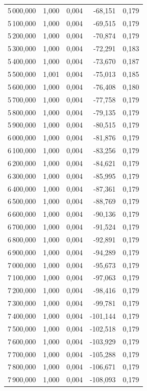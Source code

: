 \begin{longtable}{rrrrr}
5\,000,000 & 1,000 & 0,004 & -68,151 & 0,179\\
5\,100,000 & 1,000 & 0,004 & -69,515 & 0,179\\
5\,200,000 & 1,000 & 0,004 & -70,874 & 0,179\\
5\,300,000 & 1,000 & 0,004 & -72,291 & 0,183\\
5\,400,000 & 1,000 & 0,004 & -73,670 & 0,187\\
5\,500,000 & 1,001 & 0,004 & -75,013 & 0,185\\
5\,600,000 & 1,000 & 0,004 & -76,408 & 0,180\\
5\,700,000 & 1,000 & 0,004 & -77,758 & 0,179\\
5\,800,000 & 1,000 & 0,004 & -79,135 & 0,179\\
5\,900,000 & 1,000 & 0,004 & -80,515 & 0,179\\
6\,000,000 & 1,000 & 0,004 & -81,876 & 0,179\\
6\,100,000 & 1,000 & 0,004 & -83,256 & 0,179\\
6\,200,000 & 1,000 & 0,004 & -84,621 & 0,179\\
6\,300,000 & 1,000 & 0,004 & -85,995 & 0,179\\
6\,400,000 & 1,000 & 0,004 & -87,361 & 0,179\\
6\,500,000 & 1,000 & 0,004 & -88,769 & 0,179\\
6\,600,000 & 1,000 & 0,004 & -90,136 & 0,179\\
6\,700,000 & 1,000 & 0,004 & -91,524 & 0,179\\
6\,800,000 & 1,000 & 0,004 & -92,891 & 0,179\\
6\,900,000 & 1,000 & 0,004 & -94,289 & 0,179\\
7\,000,000 & 1,000 & 0,004 & -95,673 & 0,179\\
7\,100,000 & 1,000 & 0,004 & -97,063 & 0,179\\
7\,200,000 & 1,000 & 0,004 & -98,416 & 0,179\\
7\,300,000 & 1,000 & 0,004 & -99,781 & 0,179\\
7\,400,000 & 1,000 & 0,004 & -101,144 & 0,179\\
7\,500,000 & 1,000 & 0,004 & -102,518 & 0,179\\
7\,600,000 & 1,000 & 0,004 & -103,929 & 0,179\\
7\,700,000 & 1,000 & 0,004 & -105,288 & 0,179\\
7\,800,000 & 1,000 & 0,004 & -106,671 & 0,179\\
7\,900,000 & 1,000 & 0,004 & -108,093 & 0,179\\

\end{longtable}
